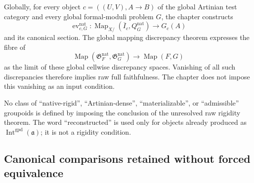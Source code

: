 Globally, for every object
$c=((U,V),A\to B)$ of the global Artinian test category and every global
formal-moduli problem $G$, the chapter constructs
\[
    \operatorname{ev}^{\mathrm{nat}}_{c,G}:
    \operatorname{Map}_{X/}(\overline I_c,Q_G^{\mathrm{nat}})
    \longrightarrow
    G_c(A)
\]
and its canonical section.  The global mapping discrepancy theorem expresses
the fibre of
\[
    \operatorname{Map}
    (\mathfrak G_F^{\mathrm{nat}},\mathfrak G_G^{\mathrm{nat}})
    \longrightarrow
    \operatorname{Map}(F,G)
\]
as the limit of these global cellwise discrepancy spaces.  Vanishing of all
such discrepancies therefore implies raw full faithfulness.  The chapter does
not impose this vanishing as an input condition.

No class of ``native-rigid'', ``Artinian-dense'', ``materializable'', or
``admissible'' groupoids is defined by imposing the conclusion of the
unresolved raw rigidity theorem.  The word ``reconstructed'' is used only for
objects already produced as $\operatorname{Int}^{\mathrm{gpd}}(\mathfrak a)$;
it is not a rigidity condition.

\subsection{Canonical comparisons retained without forced equivalence}

